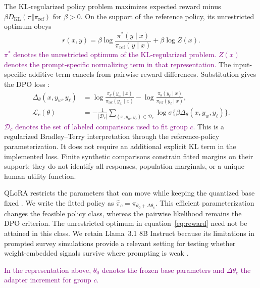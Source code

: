 The KL-regularized policy problem maximizes expected reward minus $\beta D_{\mathrm{KL}}(\pi\Vert\pi_{\mathrm{ref}})$ for $\beta>0$. On the support of the reference policy, its unrestricted optimum obeys
\begin{equation}
r(x,y)=\beta\log\frac{\pi^*(y\mid x)}{\pi_{\mathrm{ref}}(y\mid x)}+\beta\log Z(x).
\label{eq:reward}
\end{equation}
\textcolor{purple}{$\pi^*$ denotes the unrestricted optimum of the KL-regularized problem. $Z(x)$ denotes the prompt-specific normalizing term in that representation.}
The input-specific additive term cancels from pairwise reward differences. Substitution gives the DPO loss \cite{rafailov2023}:
\begin{align}
\Delta_\theta(x,y_w,y_\ell)&=\log\frac{\pi_\theta(y_w\mid x)}{\pi_{\mathrm{ref}}(y_w\mid x)}-\log\frac{\pi_\theta(y_\ell\mid x)}{\pi_{\mathrm{ref}}(y_\ell\mid x)},\\
\mathcal L_c(\theta)&=-\frac{1}{|\mathcal D_c|}\sum_{(x,y_w,y_\ell)\in\mathcal D_c}\log\sigma\{\beta\Delta_\theta(x,y_w,y_\ell)\}.
\label{eq:dpo}
\end{align}
\textcolor{purple}{$\mathcal{D}_c$ denotes the set of labeled comparisons used to fit group $c$.}
This is a regularized Bradley--Terry interpretation through the reference-policy parameterization. It does not require an additional explicit KL term in the implemented loss. Finite synthetic comparisons constrain fitted margins on their support; they do not identify all responses, population marginals, or a unique human utility function.


QLoRA restricts the parameters that can move while keeping the quantized base fixed \cite{hu2022,dettmers2023}. We write the fitted policy as $\widehat\pi_c=\pi_{\theta_0+\Delta\theta_c}$. This efficient parameterization changes the feasible policy class, whereas the pairwise likelihood remains the DPO criterion. The unrestricted optimum in equation~\eqref{eq:reward} need not be attained in this class. We retain Llama~3.1 8B Instruct because its limitations in prompted survey simulations provide a relevant setting for testing whether weight-embedded signals survive where prompting is weak \cite{dalloul2026}.

\textcolor{purple}{In the representation above, $\theta_0$ denotes the frozen base parameters and $\Delta\theta_c$ the adapter increment for group $c$.}

